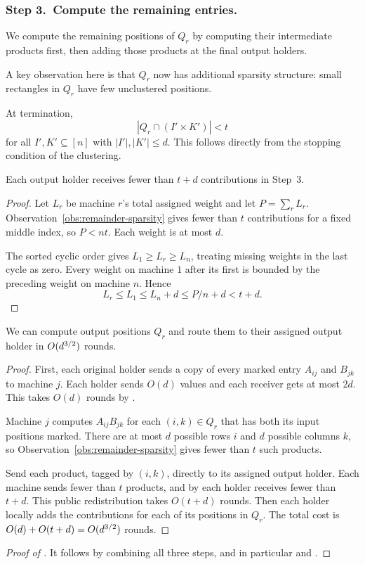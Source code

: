 \subsubsection{Step 3.~Compute the remaining entries.}
We compute the remaining positions of $Q_r$ by computing their intermediate products first, then adding those products at the final output holders.

A key observation here is that $Q_r$ now has additional sparsity structure: small rectangles in $Q_r$ have few unclustered positions.

\begin{observation}\label{obs:remainder-sparsity}
	At termination,
	\[
	|Q_r\cap(I'\times K')|<t
	\]
	for all $I',K'\subseteq[n]$ with $|I'|,|K'|\le d$.
	This follows directly from the stopping condition of the clustering.
\end{observation}

\begin{lemma}\label{lem:output-assignment}
	Each output holder receives fewer than $t+d$ contributions
	in Step~3.
\end{lemma}
\begin{proof}
	Let $L_r$ be machine $r$'s total assigned weight and let $P=\sum_r L_r$.
	Observation~\ref{obs:remainder-sparsity} gives fewer than $t$
	contributions for a fixed middle index, so $P<nt$. Each weight is
	at most $d$.

	The sorted cyclic order gives $L_1\ge L_r\ge L_n$,
	treating missing weights in the last cycle as zero.
	Every weight on machine $1$ after its first is bounded by
	the preceding weight on machine $n$. Hence
	\[
	  L_r\le L_1\le L_n+d\le P/n+d<t+d.
	\]
\end{proof}

\begin{lemma}\label{lem:compute-remainder}
	We can compute output positions $Q_r$ and route them to their assigned output holder in $O(d^{3/2})$ rounds.
\end{lemma}
\begin{proof}
	First, each original holder sends a copy of every marked entry
	$A_{ij}$ and $B_{jk}$ to machine $j$. Each holder sends $O(d)$
	values and each receiver gets at most $2d$. This takes $O(d)$
	rounds by .

	Machine $j$ computes $A_{ij}B_{jk}$ for each $(i,k)\in Q_r$
	that has both its input positions marked. There are at most $d$
	possible rows $i$ and $d$ possible columns $k$, so
	Observation~\ref{obs:remainder-sparsity} gives fewer than $t$
	such products.

	Send each product, tagged by $(i,k)$, directly to its assigned
	output holder.
	Each machine sends fewer than $t$ products, and by
	 each holder receives fewer than
	$t+d$. This public redistribution takes $O(t+d)$ rounds. Then each holder locally adds the contributions for each of its positions
	in $Q_r$. The total cost is $O(d)+O(t+d)=O(d^{3/2})$ rounds.
\end{proof}


\begin{proof}[Proof of ]
	It follows by combining all three steps, and in particular  and .
\end{proof}